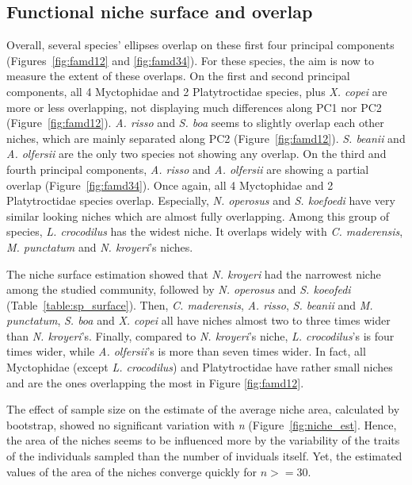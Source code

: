 \subsection{Functional niche surface and overlap}
Overall, several species' ellipses overlap on these first four principal components (Figures~\ref{fig:famd12} and \ref{fig:famd34}). For these species, the aim is now to measure the extent of these overlaps. On the first and second principal components, all 4 Myctophidae and 2 Platytroctidae species, plus \textit{X. copei} are more or less overlapping, not displaying much differences along PC1 nor PC2 (Figure~\ref{fig:famd12}). \textit{A. risso} and \textit{S. boa} seems to slightly overlap each other niches, which are mainly separated along PC2 (Figure~\ref{fig:famd12}). \textit{S. beanii} and \textit{A. olfersii} are the only two species not showing any overlap. 
On the third and fourth principal components, \textit{A. risso} and \textit{A. olfersii} are showing a partial overlap (Figure~\ref{fig:famd34}). Once again, all 4 Myctophidae and 2 Platytroctidae species overlap. Especially, \textit{N. operosus} and \textit{S. koefoedi} have very similar looking niches which are almost fully overlapping. Among this group of species, \textit{L. crocodilus} has the widest niche. It overlaps widely with \textit{C. maderensis}, \textit{M. punctatum} and \textit{N. kroyeri}'s niches. 

The niche surface estimation showed that \textit{N. kroyeri} had the narrowest niche among the studied community, followed by \textit{N. operosus} and \textit{S. koeofedi} (Table~\ref{table:sp_surface}). Then, \textit{C. maderensis}, \textit{A. risso}, \textit{S. beanii} and \textit{M. punctatum}, \textit{S. boa} and \textit{X. copei} all have niches almost two to three times wider than \textit{N. kroyeri}'s. Finally, compared to \textit{N. kroyeri}'s niche, \textit{L. crocodilus}'s is four times wider, while \textit{A. olfersii}'s is more than seven times wider. In fact, all Myctophidae (except \textit{L. crocodilus}) and Platytroctidae have rather small niches and are the ones overlapping the most in Figure \ref{fig:famd12}.

The effect of sample size on the estimate of the average niche area, calculated by bootstrap, showed no significant variation with \textit{n} (Figure~\ref{fig:niche_est}. Hence, the area of the niches seems to be influenced more by the variability of the traits of the individuals sampled than the number of inviduals itself. Yet, the estimated values of the area of the niches converge quickly for $n >= 30$. 

